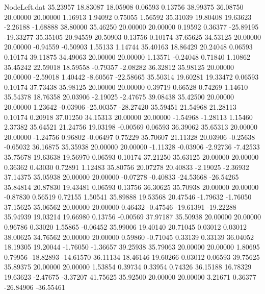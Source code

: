 \begin{filecontents}{NodeLeft.dat}
  35.23957   18.83087   18.05908     0.06593    0.13756   38.99375   36.08750   20.00000   20.00000    1.16913    1.94092    0.75055    1.56592
  35.31039   19.80408   19.63623    -2.26188   -1.68888   38.80000   35.46250   20.00000   20.00000    0.19592    0.36377  -25.89195  -19.33277
  35.35105   20.94559   20.50903     0.13756    0.10174   37.65625   34.53125   20.00000   20.00000   -0.94559   -0.50903    1.55133    1.14744
  35.40163   18.86429   20.24048     0.06593    0.10174   39.11875   34.49063   20.00000   20.00000    1.13571   -0.24048    0.71840    1.10862
  35.45242   22.59018   18.59558    -0.79357   -2.08282   36.32812   35.98125   20.00000   20.00000   -2.59018    1.40442   -8.60567  -22.58665
  35.50314   19.60281   19.33472     0.06593    0.10174   37.73438   35.98125   20.00000   20.00000    0.39719    0.66528    0.74269    1.14610
  35.54378   18.76358   20.03906    -2.19025   -2.47675   39.08438   35.42500   20.00000   20.00000    1.23642   -0.03906  -25.00357  -28.27420
  35.59451   21.54968   21.28113     0.10174    0.20918   37.01250   34.15313   20.00000   20.00000   -1.54968   -1.28113    1.15460    2.37382
  35.64521   21.24756   19.03198    -0.00569    0.06593   36.39062   35.65313   20.00000   20.00000   -1.24756    0.96802   -0.06497    0.75229
  35.70607   21.11328   20.03906    -0.25638   -0.65032   36.16875   35.35938   20.00000   20.00000   -1.11328   -0.03906   -2.92736   -7.42533
  35.75678   19.63638   19.56970     0.06593    0.10174   37.21250   35.63125   20.00000   20.00000    0.36362    0.43030    0.72891    1.12483
  35.80756   20.07278   20.40833    -2.19025   -2.36932   37.14375   35.05938   20.00000   20.00000   -0.07278   -0.40833  -24.53668  -26.54265
  35.84814   20.87830   19.43481     0.06593    0.13756   36.30625   35.70938   20.00000   20.00000   -0.87830    0.56519    0.72155    1.50541
  35.89888   19.53568   20.47546    -1.79632   -1.76050   37.15625   35.06562   20.00000   20.00000    0.46432   -0.47546  -19.61391  -19.22288
  35.94939   19.03214   19.66980     0.13756   -0.00569   37.97187   35.50938   20.00000   20.00000    0.96786    0.33020    1.55865   -0.06452
  35.99006   19.40140   20.71045     0.03012    0.03012   38.00625   34.76562   20.00000   20.00000    0.59860   -0.71045    0.33139    0.33139
  36.04052   18.19305   19.20044    -1.76050   -1.36657   39.25938   35.79063   20.00000   20.00000    1.80695    0.79956  -18.82893  -14.61570
  36.11134   18.46146   19.60266     0.03012    0.06593   39.75625   35.89375   20.00000   20.00000    1.53854    0.39734    0.33954    0.74326
  36.15188   16.78329   19.63623    -2.47675   -3.37207   41.75625   35.92500   20.00000   20.00000    3.21671    0.36377  -26.84906  -36.55461

\end{filecontents}
